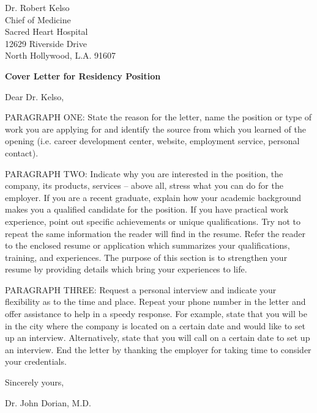 \documentclass[
	12pt, %
]{letter}
\begin{document}
\begingroup
	Dr. Robert Kelso \\
	Chief of Medicine \\
	Sacred Heart Hospital \\
	12629 Riverside Drive \\
	North Hollywood, L.A. 91607
\endgroup

\bigskip %

\textbf{Cover Letter for Residency Position}

\medskip %

Dear Dr. Kelso,

\smallskip %


PARAGRAPH ONE: State the reason for the letter, name the position or type of work you are applying for and identify the source from which you learned of the opening (i.e. career development center, website, employment service, personal contact).

PARAGRAPH TWO: Indicate why you are interested in the position, the company, its products, services -- above all, stress what you can do for the employer. If you are a recent graduate, explain how your academic background makes you a qualified candidate for the position. If you have practical work experience, point out specific achievements or unique qualifications. Try not to repeat the same information the reader will find in the resume. Refer the reader to the enclosed resume or application which summarizes your qualifications, training, and experiences. The purpose of this section is to strengthen your resume by providing details which bring your experiences to life.

PARAGRAPH THREE: Request a personal interview and indicate your flexibility as to the time and place. Repeat your phone number in the letter and offer assistance to help in a speedy response. For example, state that you will be in the city where the company is located on a certain date and would like to set up an interview. Alternatively, state that you will call on a certain date to set up an interview. End the letter by thanking the employer for taking time to consider your credentials.

\smallskip %

Sincerely yours,

\bigskip\bigskip\bigskip %

Dr. John Dorian, M.D.

\end{document}
